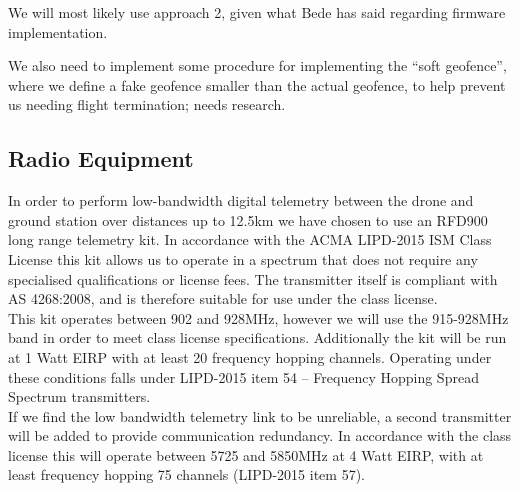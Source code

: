 We will most likely use approach 2, given what Bede has said regarding firmware implementation.

We also need to implement some procedure for implementing the ``soft geofence'', where we define a fake geofence smaller than the actual geofence, to help prevent us needing flight termination; needs research.

\subsection{Radio Equipment}
In order to perform low-bandwidth digital telemetry between the drone and ground station over distances up to 12.5km we have chosen to use an RFD900 long range telemetry kit. In accordance with the ACMA LIPD-2015 ISM Class License this kit allows us to operate in a spectrum that does not require any specialised qualifications or license fees. The transmitter itself is compliant with AS 4268:2008, and is therefore suitable for use under the class license.\\

This kit operates between 902 and 928MHz, however we will use the 915-928MHz band in order to meet class license specifications.  Additionally the kit will be run at 1 Watt EIRP with at least 20 frequency hopping channels. Operating under these conditions falls under LIPD-2015 item 54 – Frequency Hopping Spread Spectrum transmitters.\\

If we find the low bandwidth telemetry link to be unreliable, a second transmitter will be added to provide communication redundancy. In accordance with the class license this will operate between 5725 and 5850MHz at 4 Watt EIRP, with at least frequency hopping 75 channels (LIPD-2015 item 57).